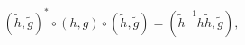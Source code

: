 \begin{equation}
  {(\tilde h,\tilde g)}^\ast\circ(h,g)\circ(\tilde h,\tilde g) = ({\tilde h}^{-1}h\tilde h,\tilde g),
\end{equation}

